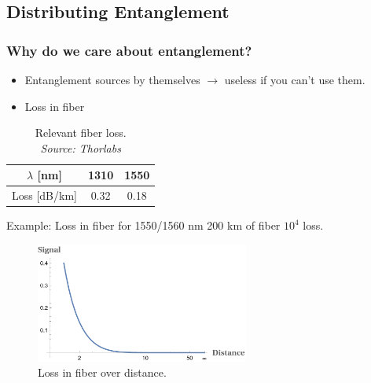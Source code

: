 \documentclass[serif,8pt]{beamer}
\begin{document}
\subsection{Distributing Entanglement}
\begin{frame}[t]
	\frametitle{Why do we care about entanglement?}
	\begin{itemize}
		\item Entanglement sources by themselves $\rightarrow$ useless if you can't use them.
		\item Loss in fiber
	\end{itemize}
	\begin{table}
		\caption{Relevant fiber loss.\\\textit{Source: Thorlabs}}\label{tab:fiberloss}
		\begin{tabular}{|c|c|c|}
			\hline
			$\lambda$ [nm] & 1310 & 1550\\
			\hline
			Loss [dB/km] & 0.32 &  0.18\\
			\hline
		\end{tabular}
	\end{table}
	\begin{exampleblock}{Example: Loss in fiber for 1550/1560 nm}
		200 km of fiber \rightarrow $10^4$ loss.
	\end{exampleblock}
	\begin{figure}
		\begin{center}
			\includegraphics[width=7cm]{FiberLoss.png}
		\end{center}
		\caption{Loss in fiber over distance.}\label{fig:fiberloss}
	\end{figure}
	
\end{frame}
\end{document}
